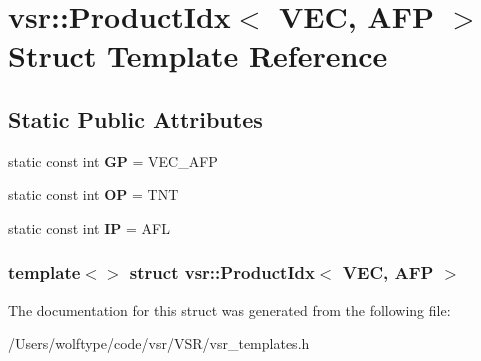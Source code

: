 \hypertarget{structvsr_1_1_product_idx_3_01_v_e_c_00_01_a_f_p_01_4}{\section{vsr\-:\-:Product\-Idx$<$ V\-E\-C, A\-F\-P $>$ Struct Template Reference}
\label{structvsr_1_1_product_idx_3_01_v_e_c_00_01_a_f_p_01_4}
}
\subsection*{Static Public Attributes}
\begin{DoxyCompactItemize}
\item 
\hypertarget{structvsr_1_1_product_idx_3_01_v_e_c_00_01_a_f_p_01_4_a8b3a6004574da0a8e4d934d301e5f9e5}{static const int {\bfseries G\-P} = V\-E\-C\-\_\-\-A\-F\-P}\label{structvsr_1_1_product_idx_3_01_v_e_c_00_01_a_f_p_01_4_a8b3a6004574da0a8e4d934d301e5f9e5}

\item 
\hypertarget{structvsr_1_1_product_idx_3_01_v_e_c_00_01_a_f_p_01_4_a18642b3f95d59dd2f065eb08b4671a69}{static const int {\bfseries O\-P} = T\-N\-T}\label{structvsr_1_1_product_idx_3_01_v_e_c_00_01_a_f_p_01_4_a18642b3f95d59dd2f065eb08b4671a69}

\item 
\hypertarget{structvsr_1_1_product_idx_3_01_v_e_c_00_01_a_f_p_01_4_af5fe2e876026e8d187a32a80996cc30b}{static const int {\bfseries I\-P} = A\-F\-L}\label{structvsr_1_1_product_idx_3_01_v_e_c_00_01_a_f_p_01_4_af5fe2e876026e8d187a32a80996cc30b}

\end{DoxyCompactItemize}
\subsubsection*{template$<$$>$ struct vsr\-::\-Product\-Idx$<$ V\-E\-C, A\-F\-P $>$}



The documentation for this struct was generated from the following file\-:\begin{DoxyCompactItemize}
\item 
/\-Users/wolftype/code/vsr/\-V\-S\-R/vsr\-\_\-templates.\-h\end{DoxyCompactItemize}
